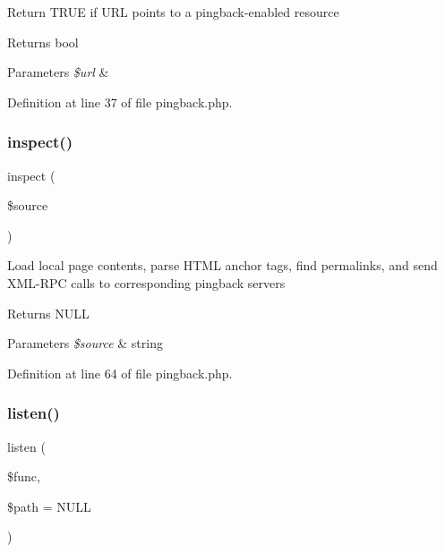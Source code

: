Return T\+R\+UE if U\+RL points to a pingback-\/enabled resource \begin{DoxyReturn}{Returns}
bool 
\end{DoxyReturn}

\begin{DoxyParams}{Parameters}
{\em \$url} & \\
\hline
\end{DoxyParams}


Definition at line 37 of file pingback.\+php.

\hypertarget{class_web_1_1_pingback_af2f57c4ad56194df3b169d4993d49dbb}{}\label{class_web_1_1_pingback_af2f57c4ad56194df3b169d4993d49dbb} 
\subsubsection{\texorpdfstring{inspect()}{inspect()}}
{\footnotesize\ttfamily inspect (\begin{DoxyParamCaption}\item[{}]{\$source }\end{DoxyParamCaption})}

Load local page contents, parse H\+T\+ML anchor tags, find permalinks, and send X\+M\+L-\/\+R\+PC calls to corresponding pingback servers \begin{DoxyReturn}{Returns}
N\+U\+LL 
\end{DoxyReturn}

\begin{DoxyParams}{Parameters}
{\em \$source} & string \\
\hline
\end{DoxyParams}


Definition at line 64 of file pingback.\+php.

\hypertarget{class_web_1_1_pingback_aa1f607b468feb8edba01ef661f980294}{}\label{class_web_1_1_pingback_aa1f607b468feb8edba01ef661f980294} 
\subsubsection{\texorpdfstring{listen()}{listen()}}
{\footnotesize\ttfamily listen (\begin{DoxyParamCaption}\item[{}]{\$func,  }\item[{}]{\$path = {\ttfamily NULL} }\end{DoxyParamCaption})}

